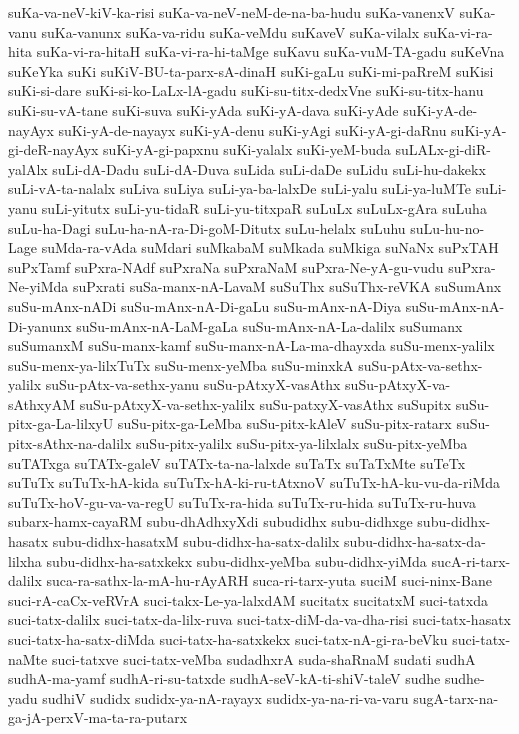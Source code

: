 {suKa-va-neV-kiV-ka-risi
suKa-va-neV-neM-de-na-ba-hudu
suKa-vanenxV
suKa-vanu
suKa-vanunx
suKa-va-ridu
suKa-veMdu
suKaveV
suKa-vilalx
suKa-vi-ra-hita
suKa-vi-ra-hitaH
suKa-vi-ra-hi-taMge
suKavu
suKa-vuM-TA-gadu
suKeVna
suKeYka
suKi
suKiV-BU-ta-parx-sA-dinaH
suKi-gaLu
suKi-mi-paRreM
suKisi
suKi-si-dare
suKi-si-ko-LaLx-lA-gadu
suKi-su-titx-dedxVne
suKi-su-titx-hanu
suKi-su-vA-tane
suKi-suva
suKi-yAda
suKi-yA-dava
suKi-yAde
suKi-yA-de-nayAyx
suKi-yA-de-nayayx
suKi-yA-denu
suKi-yAgi
suKi-yA-gi-daRnu
suKi-yA-gi-deR-nayAyx
suKi-yA-gi-papxnu
suKi-yalalx
suKi-yeM-buda
suLALx-gi-diR-yalAlx
suLi-dA-Dadu
suLi-dA-Duva
suLida
suLi-daDe
suLidu
suLi-hu-dakekx
suLi-vA-ta-nalalx
suLiva
suLiya
suLi-ya-ba-lalxDe
suLi-yalu
suLi-ya-luMTe
suLi-yanu
suLi-yitutx
suLi-yu-tidaR
suLi-yu-titxpaR
suLuLx
suLuLx-gAra
suLuha
suLu-ha-Dagi
suLu-ha-nA-ra-Di-goM-Ditutx
suLu-helalx
suLuhu
suLu-hu-no-Lage
suMda-ra-vAda
suMdari
suMkabaM
suMkada
suMkiga
suNaNx
suPxTAH
suPxTamf
suPxra-NAdf
suPxraNa
suPxraNaM
suPxra-Ne-yA-gu-vudu
suPxra-Ne-yiMda
suPxrati
suSa-manx-nA-LavaM
suSuThx
suSuThx-reVKA
suSumAnx
suSu-mAnx-nADi
suSu-mAnx-nA-Di-gaLu
suSu-mAnx-nA-Diya
suSu-mAnx-nA-Di-yanunx
suSu-mAnx-nA-LaM-gaLa
suSu-mAnx-nA-La-dalilx
suSumanx
suSumanxM
suSu-manx-kamf
suSu-manx-nA-La-ma-dhayxda
suSu-menx-yalilx
suSu-menx-ya-lilxTuTx
suSu-menx-yeMba
suSu-minxkA
suSu-pAtx-va-sethx-yalilx
suSu-pAtx-va-sethx-yanu
suSu-pAtxyX-vasAthx
suSu-pAtxyX-va-sAthxyAM
suSu-pAtxyX-va-sethx-yalilx
suSu-patxyX-vasAthx
suSupitx
suSu-pitx-ga-La-lilxyU
suSu-pitx-ga-LeMba
suSu-pitx-kAleV
suSu-pitx-ratarx
suSu-pitx-sAthx-na-dalilx
suSu-pitx-yalilx
suSu-pitx-ya-lilxlalx
suSu-pitx-yeMba
suTATxga
suTATx-galeV
suTATx-ta-na-lalxde
suTaTx
suTaTxMte
suTeTx
suTuTx
suTuTx-hA-kida
suTuTx-hA-ki-ru-tAtxnoV
suTuTx-hA-ku-vu-da-riMda
suTuTx-hoV-gu-va-va-regU
suTuTx-ra-hida
suTuTx-ru-hida
suTuTx-ru-huva
subarx-hamx-cayaRM
subu-dhAdhxyXdi
subudidhx
subu-didhxge
subu-didhx-hasatx
subu-didhx-hasatxM
subu-didhx-ha-satx-dalilx
subu-didhx-ha-satx-da-lilxha
subu-didhx-ha-satxkekx
subu-didhx-yeMba
subu-didhx-yiMda
sucA-ri-tarx-dalilx
suca-ra-sathx-la-mA-hu-rAyARH
suca-ri-tarx-yuta
suciM
suci-ninx-Bane
suci-rA-caCx-veRVrA
suci-takx-Le-ya-lalxdAM
sucitatx
sucitatxM
suci-tatxda
suci-tatx-dalilx
suci-tatx-da-lilx-ruva
suci-tatx-diM-da-va-dha-risi
suci-tatx-hasatx
suci-tatx-ha-satx-diMda
suci-tatx-ha-satxkekx
suci-tatx-nA-gi-ra-beVku
suci-tatx-naMte
suci-tatxve
suci-tatx-veMba
sudadhxrA
suda-shaRnaM
sudati
sudhA
sudhA-ma-yamf
sudhA-ri-su-tatxde
sudhA-seV-kA-ti-shiV-taleV
sudhe
sudhe-yadu
sudhiV
sudidx
sudidx-ya-nA-rayayx
sudidx-ya-na-ri-va-varu
sugA-tarx-na-ga-jA-perxV-ma-ta-ra-putarx
}
